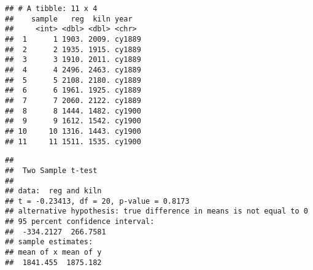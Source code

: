\documentclass[]{book}
\newenvironment{Shaded}{\begin{snugshade}}{\end{snugshade}}
\newcommand{\DataTypeTok}[1]{\textcolor[rgb]{0.13,0.29,0.53}{#1}}
\newcommand{\DecValTok}[1]{\textcolor[rgb]{0.00,0.00,0.81}{#1}}
\newcommand{\FloatTok}[1]{\textcolor[rgb]{0.00,0.00,0.81}{#1}}
\newcommand{\KeywordTok}[1]{\textcolor[rgb]{0.13,0.29,0.53}{\textbf{#1}}}
\newcommand{\NormalTok}[1]{#1}
\newcommand{\OperatorTok}[1]{\textcolor[rgb]{0.81,0.36,0.00}{\textbf{#1}}}
\newcommand{\OtherTok}[1]{\textcolor[rgb]{0.56,0.35,0.01}{#1}}
\newcommand{\StringTok}[1]{\textcolor[rgb]{0.31,0.60,0.02}{#1}}
\theoremstyle{definition}
\theoremstyle{definition}
\theoremstyle{definition}
\theoremstyle{remark}
\begin{document}
\begin{Shaded}
\end{Shaded}

\begin{verbatim}
## # A tibble: 11 x 4
##    sample   reg  kiln year  
##     <int> <dbl> <dbl> <chr> 
##  1      1 1903. 2009. cy1889
##  2      2 1935. 1915. cy1889
##  3      3 1910. 2011. cy1889
##  4      4 2496. 2463. cy1889
##  5      5 2108. 2180. cy1889
##  6      6 1961. 1925. cy1889
##  7      7 2060. 2122. cy1889
##  8      8 1444. 1482. cy1900
##  9      9 1612. 1542. cy1900
## 10     10 1316. 1443. cy1900
## 11     11 1511. 1535. cy1900
\end{verbatim}

\begin{Shaded}
\end{Shaded}

\begin{verbatim}
## 
##  Two Sample t-test
## 
## data:  reg and kiln
## t = -0.23413, df = 20, p-value = 0.8173
## alternative hypothesis: true difference in means is not equal to 0
## 95 percent confidence interval:
##  -334.2127  266.7581
## sample estimates:
## mean of x mean of y 
##  1841.455  1875.182
\end{verbatim}
\end{document}
